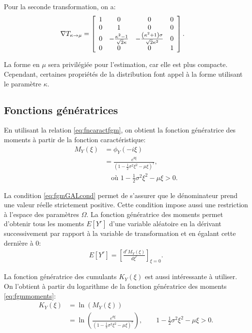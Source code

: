 Pour la seconde transformation, on a:
\begin{align}
  \nabla T_{\kappa\rightarrow\mu} &= \left[
    \begin{array}[]{cccc}
      1&0&0&0 \\
      0&1&0&0 \\
      0&-\frac{\kappa^2-1}{\sqrt{2}\kappa} & -\frac{\left(\kappa^2+1\right)\sigma}{\sqrt{2}\kappa^2} & 0 \\
      0&0&0&1
    \end{array}
  \right].
\end{align}

La forme en $\mu$ sera privilégiée pour l'estimation, car elle est
plus compacte. Cependant, certaines propriétés de la distribution font
appel à la forme utilisant le paramètre $\kappa$.

\subsection{Fonctions génératrices}

En utilisant la relation \eqref{eq:fncaractfgm}, on obtient la
fonction génératrice des moments à partir de la fonction
caractéristique:
\begin{align}
  M_{Y}(\xi) &= \phi_{Y}(-i\xi) \nonumber\\
  &=\frac{e^{\theta \xi}}{\left(1-\frac{1}{2} \sigma^2 \xi^2 - \mu \xi
    \right)^{\tau}}, \label{eq:fgmGAL}\\
  &\quad \mbox{où } 1-\frac{1}{2} \sigma^2 \xi^2 - \mu \xi > 0.
  \label{eq:fgmGALcond}
\end{align}

La condition \ref{eq:fgmGALcond} permet de s'assurer que le
dénominateur prend une valeur réelle strictement positive. Cette
condition impose aussi une restriction à l'espace des paramètres
$\Omega$. La fonction génératrice des moments permet d'obtenir tous
les moments $E[Y^r]$ d'une variable aléatoire en la dérivant
successivement par rapport à la variable de transformation et en
égalant cette dernière à 0:
\begin{align}
  \label{eq:fgmmomentsGAL}
  E[Y^r] = \left[ \frac{d^r M_Y(\xi)}{d\xi^r} \right]_{\xi=0}.
\end{align}

La fonction génératrice des cumulants $K_{Y}(\xi)$ est aussi
intéressante à utiliser. On l'obtient à partir du logarithme de la
fonction génératrice des moments \eqref{eq:fgmmoments}:
\begin{align}
  \label{eq:fgcGAL}
  K_Y(\xi) &= \ln(M_Y(\xi)) \nonumber\\
  &= \ln\left(\frac{e^{\theta \xi}}{\left(1-\frac{1}{2} \sigma^2
        \xi^2 - \mu \xi \right)^{\tau}}\right),\qquad 1-\frac{1}{2}
  \sigma^2 \xi^2 - \mu \xi > 0.
\end{align}

